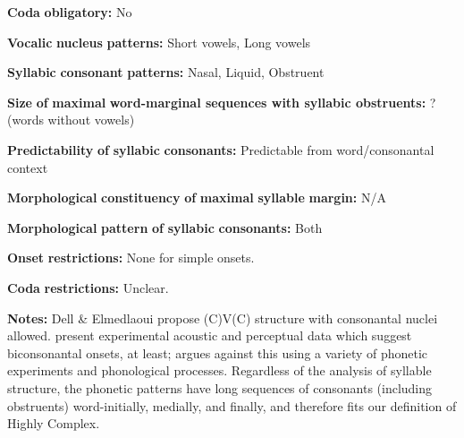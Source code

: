 \documentclass[output=paper]{langsci/langscibook}
\begin{document}
\begin{styleBody}
\textbf{Coda} \textbf{obligatory:} No
\end{styleBody}

\begin{styleBody}
\textbf{Vocalic} \textbf{nucleus} \textbf{patterns:} Short vowels, Long vowels
\end{styleBody}

\begin{styleBody}
\textbf{Syllabic} \textbf{consonant} \textbf{patterns:} Nasal, Liquid, Obstruent
\end{styleBody}

\begin{styleBody}
\textbf{Size} \textbf{of} \textbf{maximal} \textbf{word{}-marginal sequences with syllabic obstruents:} ? (words without vowels)
\end{styleBody}

\begin{styleBody}
\textbf{Predictability} \textbf{of} \textbf{syllabic} \textbf{consonants:} Predictable from word/consonantal context
\end{styleBody}

\begin{styleBody}
\textbf{Morphological} \textbf{constituency} \textbf{of} \textbf{maximal} \textbf{syllable} \textbf{margin:} N/A
\end{styleBody}

\begin{styleBody}
\textbf{Morphological} \textbf{pattern} \textbf{of} \textbf{syllabic} \textbf{consonants:} Both
\end{styleBody}

\begin{styleBody}
\textbf{Onset} \textbf{restrictions:} None for simple onsets.
\end{styleBody}

\begin{styleBody}
\textbf{Coda} \textbf{restrictions:} Unclear.
\end{styleBody}

\begin{styleBody}
\textbf{Notes:} Dell \& Elmedlaoui propose (C)V(C) structure with consonantal nuclei allowed. \citet{PuechLouali1999} present experimental acoustic and perceptual data which suggest biconsonantal onsets, at least; \citet{Ridouane2008} argues against this using a variety of phonetic experiments and phonological processes. Regardless of the analysis of syllable structure, the phonetic patterns have long sequences of consonants (including obstruents) word-initially, medially, and finally, and therefore fits our definition of Highly Complex.
\end{styleBody}
\end{document}
